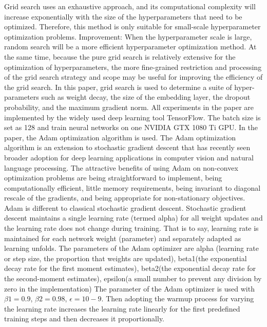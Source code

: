 Grid search uses an exhaustive approach, and its computational complexity will increase exponentially with the size of the hyperparameters that need to be optimized. Therefore, this method is only suitable for small-scale hyperparameter optimization problems.
Improvement:
When the hyperparameter scale is large, random search will be a more efficient hyperparameter optimization method. At the same time, because the pure grid search is relatively extensive for the optimization of hyperparameters, the more fine-grained restriction and processing of the grid search strategy and scope may be useful for improving the efficiency of the grid search.
In this paper, grid search is used to determine a suite of hyper-parameters such as weight decay, the size of the embedding layer, the dropout probability, and the maximum gradient norm. All experiments in the paper are implemented by the widely used deep learning tool TensorFlow. The batch size is set as 128 and train neural networks on one NVIDIA GTX 1080 Ti GPU. 
In the paper, the Adam optimization algorithm is used. The Adam optimization algorithm is an extension to stochastic gradient descent that has recently seen broader adoption for deep learning applications in computer vision and natural language processing. The attractive benefits of using Adam on non-convex optimization problems are being straightforward to implement, being computationally efficient, little memory requirements, being invariant to diagonal rescale of the gradients, and being appropriate for non-stationary objectives. 
Adam is different to classical stochastic gradient descent. Stochastic gradient descent maintains a single learning rate (termed alpha) for all weight updates and the learning rate does not change during training. That is to say, learning rate is maintained for each network weight (parameter) and separately adapted as learning unfolds. 
The parameters of the Adam optimizer are alpha (learning rate or step size, the proportion that weights are updated), beta1(the exponential decay rate for the first moment estimates), beta2(the exponential decay rate for the second-moment estimates), epsilon(a small number to prevent any division by zero in the implementation)
The parameter of the Adam optimizer is used with $\beta1 = 0.9$, $\beta 2 = 0.98$, $\epsilon = 10-9$. Then adopting the warmup process for varying the learning rate increases the learning rate linearly for the first predefined training steps and then decreases it proportionally.


